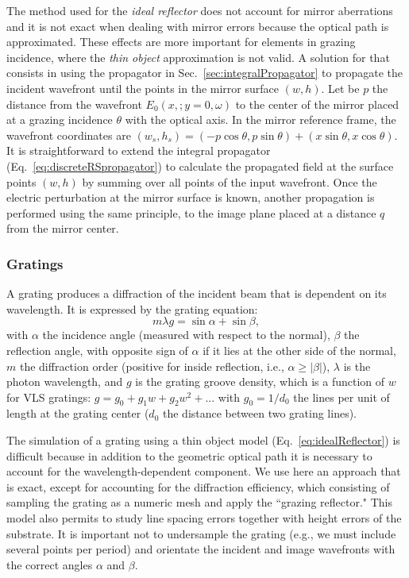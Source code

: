 \documentclass{iucr}
\begin{document}
The method used for the {\it ideal reflector} does not account for mirror aberrations and it is not exact when dealing with mirror errors because the optical path is approximated. These effects are more important for elements in grazing incidence, where the {\it thin object} approximation is not valid. A solution for that consists in using the propagator in Sec.~\ref{sec:integralPropagator} to propagate the incident wavefront until the points in the mirror surface $(w,h)$. Let be $p$ the distance from the wavefront $E_0(x,;y=0,\omega)$ to the center of the mirror placed at a grazing incidence $\theta$ with the optical axis. In the mirror reference frame, the wavefront coordinates are $(w_s, h_s) =(-p \cos \theta, p \sin \theta) + (x \sin \theta, x \cos \theta)$. It is straightforward to extend the integral propagator (Eq.~\ref{eq:discreteRSpropagator}) to calculate the propagated field at the surface points $(w,h)$ by summing over all points of the input wavefront. Once the electric perturbation at the mirror surface is known, another propagation is performed using the same principle, to the image plane placed at a distance $q$ from the mirror center.

\subsubsection{Gratings}
\label{sec:grating}

A grating produces a diffraction of the incident beam that is dependent on its wavelength. It is expressed by the grating equation:
\begin{equation}
    m \lambda g = \sin\alpha + \sin\beta,
\end{equation}
with $\alpha$ the incidence angle (measured with respect to the normal), $\beta$ the reflection angle, with opposite sign of $\alpha$ if it lies at the other side of the normal, $m$ the diffraction order (positive for inside reflection, i.e., $\alpha \ge |\beta|$),
$\lambda$ is the photon wavelength, and $g$ is the grating groove density, which is a function of $w$ for VLS gratings: $g = g_0 + g_1 w + g_2 w^2 + ...$ with $g_0 = 1/d_0$ the lines per unit of length at the grating center ($d_0$ the distance between two grating lines).

The simulation of a grating using a thin object model (Eq.~\ref{eq:idealReflector}) is difficult because in addition to the geometric optical path it is necessary to account for the wavelength-dependent component. We use here an approach that is exact, except for accounting for the diffraction efficiency, which consisting of sampling the grating as a numeric mesh and apply the ``grazing reflector." 
This model also permits to study line spacing errors together with height errors of the substrate. It is important not to undersample the grating (e.g., we must include several points per period) and orientate the incident and image wavefronts with the correct angles $\alpha$ and $\beta$.
\end{document}
